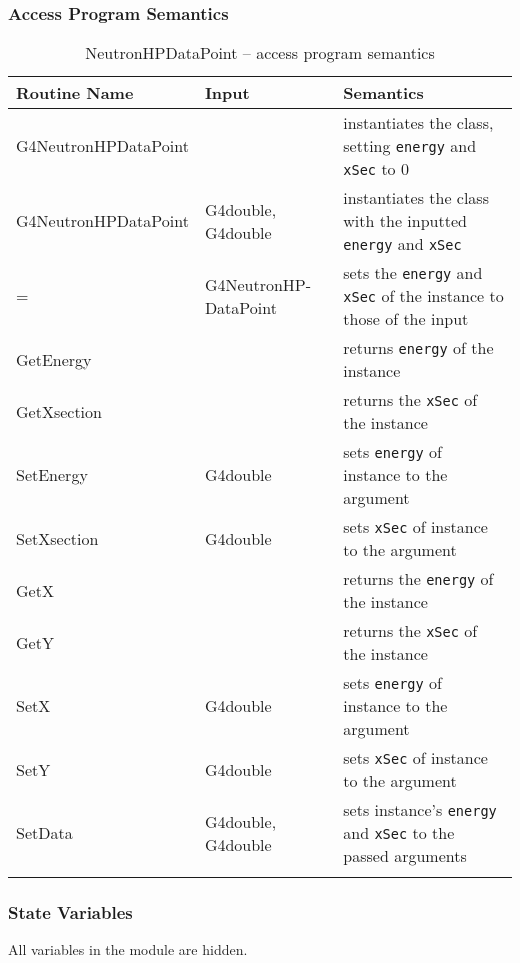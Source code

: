 \documentclass[12pt]{article}
\begin{document}
\subsubsection{Access Program Semantics}%
\begin{table}[H]
\caption{NeutronHPDataPoint -- access program semantics}\label{Table_NeutronHPDataPointSemantics}
\begin{tabular}{l p{} p{}}
\toprule
\bf Routine Name & \bf Input & \bf Semantics \\ \midrule
\arrayrulecolor{lightgray}
G4NeutronHPDataPoint  &                      & instantiates the class, setting \texttt{energy} and \texttt{xSec} to 0\\\hline
G4NeutronHPDataPoint  & G4double, G4double   & instantiates the class with the inputted \texttt{energy} and \texttt{xSec}\\\hline
=                     & G4NeutronHP-DataPoint& sets the \texttt{energy} and \texttt{xSec} of the instance to those of the input \\\hline
GetEnergy             &                      & returns \texttt{energy} of the instance \\\hline
GetXsection           &                      & returns the \texttt{xSec} of the instance\\\hline
SetEnergy             & G4double             & sets \texttt{energy} of instance to the argument\\\hline
SetXsection           & G4double             & sets \texttt{xSec} of instance to the argument\\\hline
GetX                  &                      & returns the \texttt{energy} of the instance\\\hline
GetY 				  &                      & returns the \texttt{xSec} of the instance\\\hline
SetX				  & G4double             & sets \texttt{energy} of instance to the argument\\\hline
SetY				  & G4double             & sets \texttt{xSec} of instance to the argument \\\hline
SetData				  & G4double, G4double   & sets instance's \texttt{energy} and \texttt{xSec} to the passed arguments\\
\arrayrulecolor{black}
\bottomrule
\end{tabular}
\end{table}

\subsubsection{State Variables}%
All variables in the module are hidden.
\end{document}
